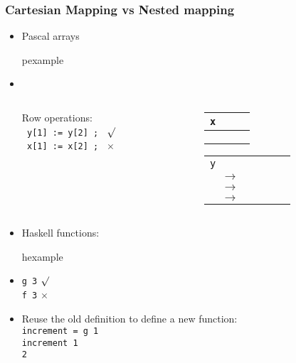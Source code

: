 \begin{frame}
\frametitle{Cartesian Mapping vs Nested mapping}
\begin{itemize}
 \item Pascal arrays
	\begin{beamercolorbox}{pexample}
	\codekdizP
	\end{beamercolorbox}
\item\ \\
\begin{columns}
 \begin{column}[t]{.45\linewidth}
 Row operations:\\
	\texttt{ y[1] := y[2] ; } {\color{green}$\surd$}\\
	\texttt{ x[1] := x[2] ; } {\color{red}$\times$}
\end{column}
\begin{column}[t]{.5\linewidth}
 \begin{tabular}[t]{|l|l|l|l|}
\multicolumn{4}{l}{\tt x}\\\hline
& & & \\ \hline
& & & \\ \hline
& & & \\ \hline
 \end{tabular}\hspace*{2em}
\begin{tabular}[t]{|l|l|l|l|l|l|}
\multicolumn{6}{l}{\tt y}\\ \cline{1-1}\cline{3-6}
&$\rightarrow$& & & &\\ \cline{1-1}\cline{3-6}
&$\rightarrow$& & & &\\ \cline{1-1}\cline{3-6}
&$\rightarrow$& & & &\\ \cline{1-1}\cline{3-6}
 \end{tabular}
\end{column}
\end{columns}
	
\end{itemize}
\end{frame}


\begin{frame}
 \begin{itemize}
  \item Haskell functions:
\begin{beamercolorbox}{hexample}
\codekfonH
\end{beamercolorbox}
 \item \texttt{g 3}  {\color{green}$\surd$}\\
       \texttt{f 3}  {\color{red}$\times$}\\
 \item Reuse the old definition to define a new function:\\
	\texttt{increment = g 1} \\
	\texttt{increment 1}\\
	\texttt{2}
 \end{itemize}
\end{frame}


